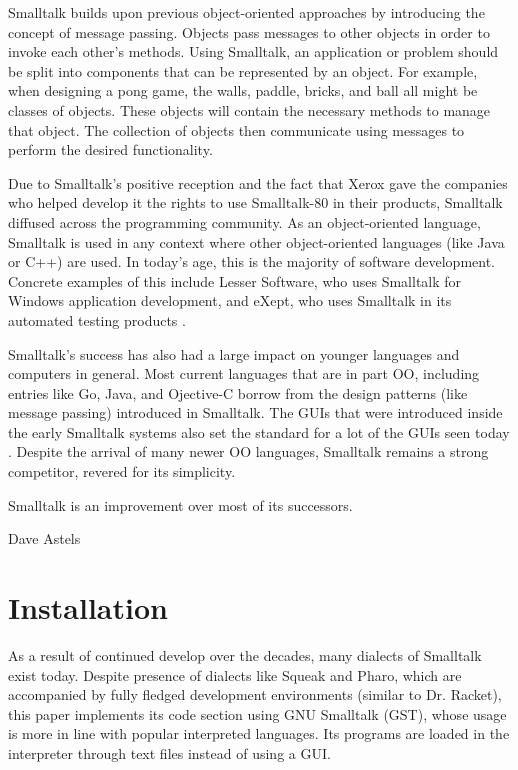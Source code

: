 Smalltalk builds upon previous object-oriented approaches by
introducing the concept of message passing. Objects pass messages to
other objects in order to invoke each other's methods. Using
Smalltalk, an application or problem should be split into components
that can be represented by an object. For example, when designing a
pong game, the walls, paddle, bricks, and ball all might be classes of
objects. These objects will contain the necessary methods to manage
that object. The collection of objects then communicate using messages
to perform the desired functionality.

Due to Smalltalk's positive reception and the fact that Xerox gave the
companies who helped develop it the rights to use Smalltalk-80 in
their products, Smalltalk diffused across the programming
community. As an object-oriented language, Smalltalk is used in any
context where other object-oriented languages (like Java or C++) are
used. In today's age, this is the majority of software
development. Concrete examples of this include Lesser Software, who
uses Smalltalk for Windows application development, and eXept, who
uses Smalltalk in its automated testing products \cite{exept}
\cite{lesser}.

Smalltalk's success has also had a large impact on younger languages
and computers in general. Most current languages that are in part OO,
including entries like Go, Java, and Ojective-C borrow from the design
patterns (like message passing) introduced in Smalltalk. The GUIs that
were introduced inside the early Smalltalk systems also set the
standard for a lot of the GUIs seen today \cite{influence}. Despite
the arrival of many newer OO languages, Smalltalk remains a strong
competitor, revered for its simplicity.

\begin{center} Smalltalk is an improvement over most of its
successors.
\end{center}

\begin{flushright}Dave Astels \cite{dave}\end{flushright}




\section{Installation}

As a result of continued develop over the decades, many dialects of
Smalltalk exist today. Despite presence of dialects like Squeak and
Pharo, which are accompanied by fully fledged development environments
(similar to Dr. Racket), this paper implements its code section using
GNU Smalltalk (GST), whose usage is more in line with popular
interpreted languages. Its programs are loaded in the interpreter
through text files instead of using a GUI.

